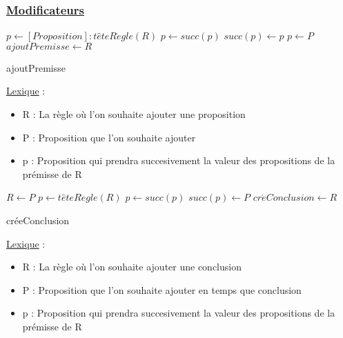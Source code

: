 \documentclass{article}
\begin{document}
\subsubsection{\underline{Modificateurs}}
\begin{algorithm}
    \SetAlgoLined 
    \begin{algorithmic}
            \STATE $p \gets [Proposition] : t\hat{e}teR\grave{e}gle(R)$
                \STATE $p \gets succ(p)$
            \ENDWHILE
            \STATE $succ(p) \gets p$ 
            \STATE $p \gets P$
         \ENDIF
         \STATE $ajoutPremisse \gets R$
    \end{algorithmic}
    \caption{ajoutPremisse}
\end{algorithm}

\underline{Lexique} :
\begin{itemize}
    \item R : La règle où l'on souhaite ajouter une proposition
    \item P : Proposition que l'on souhaite ajouter
    \item p : Proposition qui prendra succesivement la valeur des propositions de la prémisse de R
\end{itemize}

\begin{algorithm}
    \SetAlgoLined 
    \begin{algorithmic}
            \STATE $R \gets P$
        \ELSE
            \STATE $p \gets t\hat{e}teR\grave{e}gle(R)$
                \STATE $p \gets succ(p)$
            \ENDWHILE
            \STATE $succ(p) \gets P$ 
         \ENDIF
         \STATE $cr\acute{e}Conclusion \gets R$
    \end{algorithmic}
    \caption{créeConclusion}
\end{algorithm}

\underline{Lexique} :
\begin{itemize}
    \item R : La règle où l'on souhaite ajouter une conclusion
    \item P : Proposition que l'on souhaite ajouter en temps que conclusion
    \item p : Proposition qui prendra succesivement la valeur des propositions de la prémisse de R
\end{itemize}
\end{document}
